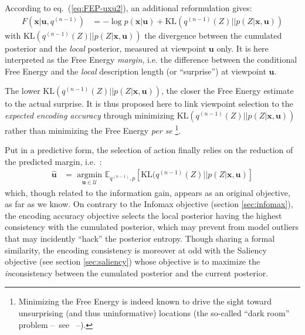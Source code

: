 \documentclass[12pt,twoside,openright]{article}
\begin{document}
According to eq.~(\ref{eq:FEP-uxu2}), an additional reformulation gives:
\begin{align}
F(\boldsymbol{x}|\boldsymbol{u}, q^{(n-1)}) &= -\log p(\boldsymbol{x}|\boldsymbol{u}) + \text{KL}(q^{(n-1)}(Z)||p(Z|\boldsymbol{x}, \boldsymbol{u}))
\end{align}
with $\text{KL}(q^{(n-1)}(Z)||p(Z|\boldsymbol{x}, \boldsymbol{u}))$ the divergence between the cumulated posterior and the \emph{local} posterior, measured at viewpoint $\boldsymbol{u}$ only. It is here interpreted as the Free Energy \emph{margin}, i.e. the difference between the conditional Free Energy and 
the \emph{local} description length (or ``surprise'') at viewpoint $\boldsymbol{u}$.

The lower $\text{KL}(q^{(n-1)}(Z)||p(Z|\boldsymbol{x}, \boldsymbol{u}))$, the closer the Free Energy estimate to the actual surprise. It is thus proposed here to link viewpoint selection to the \emph{expected encoding accuracy} through minimizing $\text{KL}(q^{(n-1)}(Z)||p(Z|\boldsymbol{x}, \boldsymbol{u}))$ rather than minimizing the Free Energy \emph{per se} 
\footnote{Minimizing the Free Energy is indeed known to drive the sight toward unsurprising (and thus uninformative) locations (the so-called ``dark room'' problem --~see \cite{friston2012perceptions}~--).}.

Put in a predictive form, the selection of action finally relies on the reduction of the predicted margin, i.e.~:
\begin{align}
 \hat{\boldsymbol{u}} &= \underset{\boldsymbol{u} \in \mathcal{U}}{\text{ argmin }} \mathbb{E}_{q^{(n-1)}, p}\left[\text{KL}(q^{(n-1)}(Z)||p(Z|\boldsymbol{x}, \boldsymbol{u})\right]
\end{align}
which, though related to the information gain, appears as an original objective, as far as we know. 
On contrary to the Infomax objective (section \ref{sec:infomax}), the encoding accuracy objective selects the local posterior having the highest consistency with the cumulated posterior, which may prevent from model outliers that may incidently ``hack'' the posterior entropy.
Though sharing a formal similarity, the encoding consistency is moreover at odd with the Saliency objective (see section \ref{sec:saliency}) whose objective is to maximize the \emph{in}consistency between the cumulated posterior and the current posterior.
\end{document}

